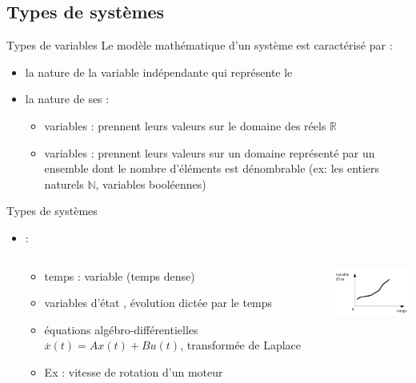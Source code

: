 \documentclass[compress]{beamer}
\begin{document}
\subsection{Types de systèmes}
\begin{frame}{Types de variables}
Le modèle mathématique d'un système est caractérisé par :
\begin{itemize}
\item la nature de la variable indépendante qui représente le 
\item la nature de ses  :
	\begin{itemize}
	\item variables  : prennent leurs valeurs sur le domaine des réels $\mathbb{R}$
	\item variables  : prennent leurs valeurs sur un domaine représenté par un ensemble  dont le nombre d'éléments est dénombrable (ex: les  entiers naturels $\mathbb{N}$, variables booléennes)
	\end{itemize} 
\end{itemize}
\end{frame}

\begin{frame}{Types de systèmes}
\begin{itemize} 
\item {} :
\begin{columns}
	\begin{column}{.7\textwidth}
		\begin{itemize}
		\item temps : variable  (temps dense)
		\item variables d'état , évolution dictée par le temps
		\item équations algébro-différentielles $\overset{.}{x}(t)=Ax(t)+Bu(t)$, transformée de Laplace
		\item Ex : vitesse de rotation d'un moteur
		\end{itemize}
	\end{column}
	\begin{column}{.3\textwidth}
		\includegraphics[width=3.7cm]{cont}
	\end{column}	
\end{columns}
\end{itemize}
\end{frame}
\end{document}
